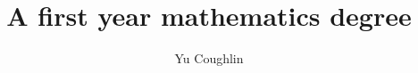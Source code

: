 \documentclass{report}
\title{A first year mathematics degree}
\author{Yu Coughlin}
\date{ }
\begin{document}
\maketitle

\tableofcontents
\let\tableofcontents\relax










\end{document}
